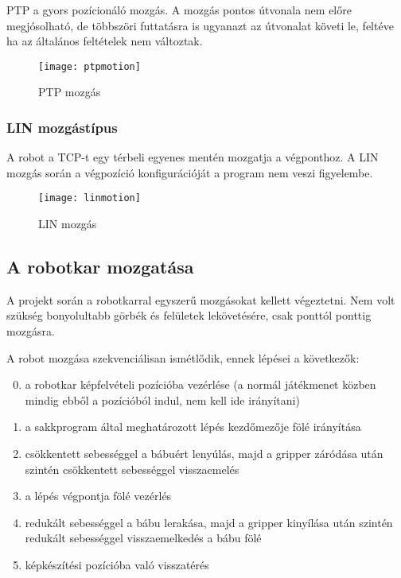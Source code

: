 \documentclass[../documentation.tex]{subfiles}
\begin{document}
PTP a gyors pozícionáló mozgás. A mozgás pontos útvonala nem előre megjósolható, de többszöri futtatásra is ugyanazt az útvonalat követi le, feltéve ha az általános feltételek nem változtak.

\begin{figure}[h]
    \centering
    \texttt{[image: ptpmotion]}
    \caption{PTP mozgás\cite{sunrisemanual}}
    \label{fig:ptpmotion}
\end{figure}

\subsubsection{LIN mozgástípus}
A robot a TCP-t egy térbeli egyenes mentén mozgatja a végponthoz. A LIN mozgás során a végpozíció konfigurációját a program nem veszi figyelembe.

\begin{figure}[h]
    \centering
    \texttt{[image: linmotion]}
    \caption{LIN mozgás\cite{sunrisemanual}}
    \label{fig:linmotion}
\end{figure}

\newpage
\subsection{A robotkar mozgatása} \label{sec:motionprogramming}
A projekt során a robotkarral egyszerű mozgásokat kellett végeztetni. Nem volt szükség bonyolultabb görbék és felületek lekövetésére, csak ponttól ponttig mozgásra.

A robot mozgása szekvenciálisan ismétlődik, ennek lépései a következők:
\begin{enumerate}
\setcounter{enumi}{-1} 
	\item a robotkar képfelvételi pozícióba vezérlése (a normál játékmenet közben mindig ebből a pozícióból indul, nem kell ide irányítani)
	\item a sakkprogram által meghatározott lépés kezdőmezője fölé irányítása
	\item csökkentett sebességgel a bábuért lenyúlás, majd a gripper záródása után szintén csökkentett sebességgel visszaemelés
	\item a lépés végpontja fölé vezérlés
	\item redukált sebességgel a bábu lerakása, majd a gripper kinyílása után szintén redukált sebességgel visszaemelkedés a bábu fölé
	\item képkészítési pozícióba való visszatérés
\end{enumerate}
\end{document}
